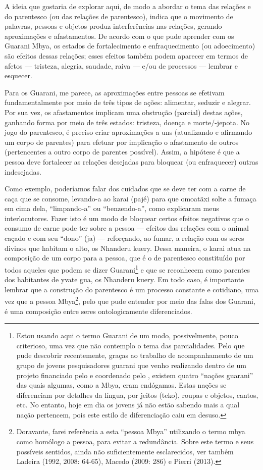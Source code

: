 A ideia que gostaria de explorar aqui, de modo a abordar o tema das
relações e do parentesco (ou das relações de parentesco), indica que o
movimento de palavras, pessoas e objetos produz interferências nas
relações, gerando aproximações e afastamentos. De acordo com o que pude
aprender com os Guarani Mbya, os estados de fortalecimento e
enfraquecimento (ou adoecimento) são efeitos dessas relações; esses
efeitos também podem aparecer em termos de afetos — tristeza, alegria,
saudade, raiva — e/ou de processos — lembrar e esquecer.

Para os Guarani, me parece, as aproximações entre pessoas se efetivam
fundamentalmente por meio de três tipos de ações: alimentar, seduzir e
alegrar. Por sua vez, os afastamentos implicam uma obstrução (parcial)
destas ações, ganhando forma por meio de três estados: tristeza, doença
e morte/-jepota. No jogo do parentesco, é preciso criar aproximações a
uns (atualizando e afirmando um corpo de parentes) para efetuar por
implicação o afastamento de outros (pertencentes a outro corpo de
parentes possível). Assim, a hipótese é que a pessoa deve fortalecer as
relações desejadas para bloquear (ou enfraquecer) outras indesejadas.

Como exemplo, poderíamos falar dos cuidados que se deve ter com a carne
de caça que se consome, levando-a ao karai (pajé) para que omoatãxi
solte a fumaça em cima dela, ``limpando-a'' ou ``benzendo-a'', como
explicaram meus interlocutores. Fazer isto é um modo de bloquear
certos efeitos negativos que o consumo de carne pode ter sobre a pessoa
— efeitos das relações com o animal caçado e com seu ``dono'' (ja) —
reforçando, ao fumar, a relação com os seres divinos que habitam o
alto, os Nhanderu kuery. Dessa maneira, o karai atua na composição de
um corpo para a pessoa, que é o de parentesco constituído por todos
aqueles que podem se dizer Guarani\footnote{Estou usando aqui o termo
Guarani de um modo, possivelmente, pouco criterioso, uma vez que não
contemplo o tema das parcialidades. Pelo que pude descobrir
recentemente, graças ao trabalho de acompanhamento de um grupo de
jovens pesquisadores guarani que venho realizando dentro de um projeto
financiado pelo  e coordenado pelo , existem quatro ``nações
guarani'' das quais algumas, como a Mbya, eram endógamas. Estas nações
se diferenciam por detalhes da língua, por jeitos (teko), roupas e
objetos, cantos, etc. No entanto, hoje em dia os jovens já não estão
sabendo mais a qual nação pertencem, pois este estilo de diferenciação
caiu em desuso.} e que se reconhecem como parentes dos habitantes de
yvate gua, os Nhanderu kuery. Em todo caso, é importante lembrar que a
construção do parentesco é um processo constante e cotidiano, uma vez
que a pessoa Mbya\footnote{Doravante, farei referência a esta ``pessoa
Mbya'' utilizando o termo mbya como homólogo a pessoa, para evitar a
redundância. Sobre este termo e seus possíveis sentidos, ainda não
suficientemente esclarecidos, ver também Ladeira (1992, 2008: 64-65),
Macedo (2009: 286) e Pierri (2013).  }, pelo que pude entender por meio
das falas dos Guarani, é uma composição entre seres ontologicamente
diferenciados.

